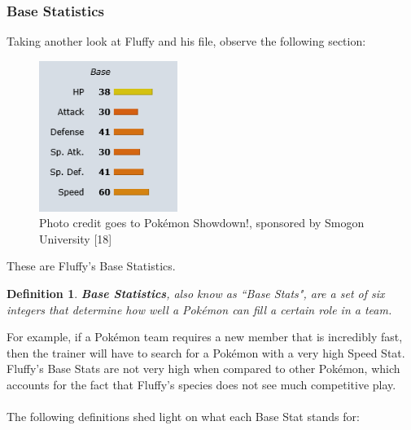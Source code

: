 \documentclass{article}
\newtheorem{definition}{Definition}
\begin{document}
\subsubsection{Base Statistics}
Taking another look at Fluffy and his file, observe the following section:\\
\begin{figure}[H]
	\includegraphics[width=0.4\textwidth]{fluffystats.png}
	\centering
	\caption{Photo credit goes to Pok\'emon Showdown!, sponsored by Smogon University [18]}
\end{figure}
These are Fluffy's Base Statistics. 
\begin{definition}
	\textbf{Base Statistics}, also know as ``Base Stats", are a set of six integers that determine how well a Pok\'emon can fill a certain role in a team.
\end{definition}
For example, if a Pok\'emon team requires a new member that is incredibly fast, then the trainer will have to search for a Pok\'emon with a very high Speed Stat. Fluffy's Base Stats are not very high when compared to other Pok\'emon, which accounts for the fact that Fluffy's species does not see much competitive play.\\\\
The following definitions shed light on what each Base Stat stands for:
\end{document}
